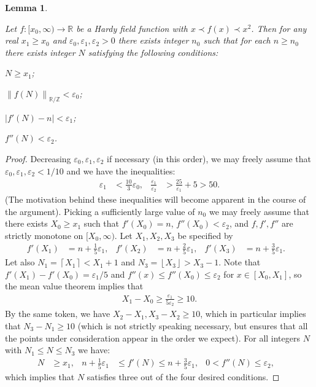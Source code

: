 \documentclass{amsart}
\newtheorem{lemma}[theorem]{Lemma}
\theoremstyle{definition}
\newcommand{\fpa}[1]{\left\lVert #1 \right\rVert_{\RR/\ZZ}}
\newcommand{\floor}[1]{\left\lfloor #1 \right\rfloor}
\newcommand{\abs}[1]{\left|#1\right|}
\newcommand{\ceil}[1]{\left\lceil #1 \right\rceil}
\newcommand{\e}{\varepsilon}
\newcommand{\ZZ}{\mathbb{Z}}
\newcommand{\RR}{\mathbb{R}}
\begin{document}
\begin{lemma}
\label{lem:lambda-sufficient}

	Let $f \colon [x_0,\infty) \to \RR$ be a Hardy field function with $x \prec f(x) \prec x^2$. Then for any real $x_1 \geq x_0$ and $\e_0,\e_1,\e_2 > 0$ there exists integer $n_0$ such that for each $n \geq n_0$ there exists integer $N$ satisfying the following conditions:
\begin{inparaenum}
\item $N \geq x_1$;
\item $\fpa{f(N)} < \e_0$;
\item $\abs{f'(N) - n} < \e_1$;
\item $f''(N) < \e_2$.
\end{inparaenum}
\end{lemma}
\begin{proof}
	Decreasing $\e_0,\e_1,\e_2$ if necessary (in this order), we may freely assume that $\e_0,\e_1,\e_2 < 1/10$ and we have the inequalities:
\begin{align*}
	\e_1 &< \frac{10}{3} \e_0,&
	\frac{\e_1}{\e_2} &> \frac{25}{\e_1} + 5 > 50.
\end{align*}
(The motivation behind these inequalities will become apparent in the course of the argument). Picking a sufficiently large value of $n_0$ we may freely assume that there exists $X_0 \geq x_1$ such that $f'(X_0) = n$, $f''(X_0) < \e_2$, and $f,f',f''$ are strictly monotone on $[X_0,\infty)$. Let $X_1,X_2,X_3$ be specified by
	\begin{align*}
	f'(X_1) &= n + \frac{1}{5} \e_1,&
	f'(X_2) &= n + \frac{2}{5} \e_1,&
	f'(X_3) &= n + \frac{3}{5} \e_1.&	
	\end{align*}
	Let also $N_1 = \ceil{X_1} < X_1 + 1$ and $N_3 = \floor{X_3} > X_3 - 1$. 
	Note that $f'(X_1) - f'(X_0) = \e_1/5$ and $f''(x) \leq f''(X_0) \leq \e_2$ for $x \in [X_0,X_1]$, so the mean value theorem implies that
	\begin{align*}
	X_1 - X_0 \geq  \frac{\e_1}{5\e_2} \geq 10.
	\end{align*}		
	By the same token, we have $X_2-X_1, X_3-X_2 \geq 10$, which in particular implies that $N_3-N_1 \geq 10$ (which is not strictly speaking necessary, but ensures that all the points under consideration appear in the order we expect). 	
	For all integers $N$ with $N_1 \leq N \leq N_3$ we have:
\begin{align*}
N &\geq x_1,&
n+\frac{1}{5}\e_1 &\leq f'(N) \leq n+\frac{3}{5}\e_1,&
0 < f''(N) \leq \e_2,&
\end{align*}	
which implies that $N$ satisfies three out of the four desired conditions.


\end{proof}
\end{document}
